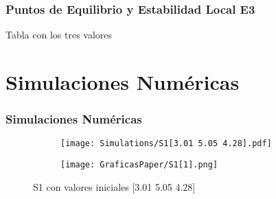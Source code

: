 \documentclass{beamer}
\begin{document}
\begin{frame}
	\frametitle{Puntos de Equilibrio y Estabilidad Local E3}
	\begin{minipage}{10cm}
		Tabla con los tres valores
	\end{minipage}
\end{frame}
\section{Simulaciones Num\'ericas}

\begin{frame}
	\frametitle{Simulaciones Num\'ericas}
	\begin{minipage}{10cm}
		\begin{figure}[h]
			\centering
			\begin{subfigure}[b]{0.5\textwidth}
				\centering
				\texttt{[image: Simulations/S1[3.01 5.05 4.28].pdf]}
				\label{fig:grafica1}
			\end{subfigure}%
			\begin{subfigure}[b]{0.5\textwidth}
				\centering
				\texttt{[image: GraficasPaper/S1[1].png]}
				\label{fig:grafica12}
			\end{subfigure}
			\caption{S1 con valores iniciales [3.01 5.05 4.28]}
			\label{fig:comparacion1}
		\end{figure}

	\end{minipage}
\end{frame}




\end{document}
